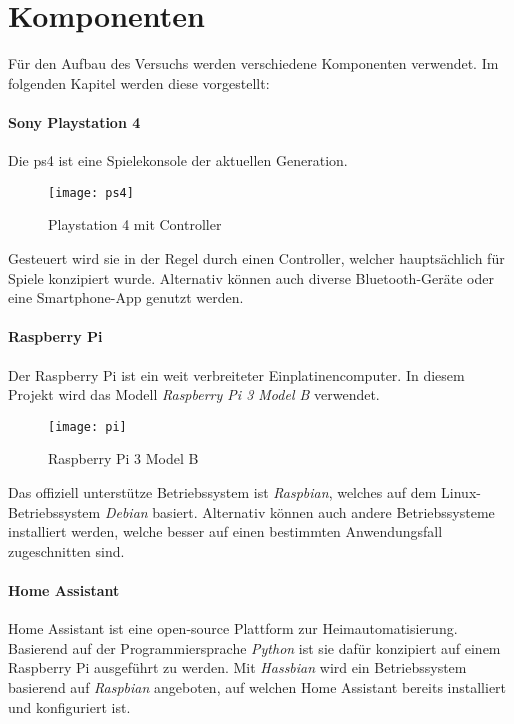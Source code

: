 \newpage
\section{Komponenten}\label{sec:komponenten}
Für den Aufbau des Versuchs werden verschiedene Komponenten verwendet.
Im folgenden Kapitel werden diese vorgestellt:

\paragraph{Sony Playstation 4 \cite{PS4Welco38:online}}
Die \ac{ps4} ist eine Spielekonsole der aktuellen Generation.

\begin{figure}[h!]
    \centering
    \texttt{[image: ps4]}
    \caption{Playstation 4 mit Controller}\label{fig:ps4}
\end{figure}

Gesteuert wird sie in der Regel durch einen Controller,
welcher hauptsächlich für Spiele konzipiert wurde.
Alternativ können auch diverse Bluetooth-Geräte oder eine Smartphone-App genutzt werden.

\paragraph{Raspberry Pi \cite{Whatisth47:online}}
Der Raspberry Pi ist ein weit verbreiteter Einplatinencomputer.
In diesem Projekt wird das Modell \textit{Raspberry Pi 3 Model B} verwendet.

\begin{figure}[h!]
    \centering
    \texttt{[image: pi]}
    \caption{Raspberry Pi 3 Model B \cite{Raspberr2:online}}\label{fig:pi}
\end{figure}

Das offiziell unterstütze Betriebssystem ist \textit{Raspbian},
welches auf dem Linux-Betriebssystem \textit{Debian} basiert.
Alternativ können auch andere Betriebssysteme installiert werden,
welche besser auf einen bestimmten Anwendungsfall zugeschnitten sind.

\newpage

\paragraph{Home Assistant \cite{HomeAssi51:online}}
Home Assistant ist eine open-source Plattform zur Heimautomatisierung.
Basierend auf der Programmiersprache \textit{Python} ist sie dafür konzipiert
auf einem Raspberry Pi ausgeführt zu werden.
Mit \textit{Hassbian} wird ein Betriebssystem basierend auf \textit{Raspbian} angeboten,
auf welchen Home Assistant bereits installiert und konfiguriert ist.

